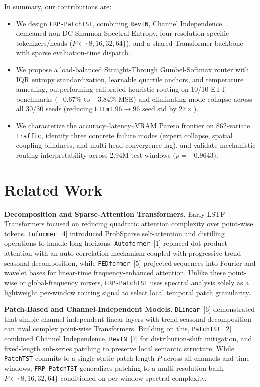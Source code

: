 \documentclass[11pt, letterpaper]{article}
\begin{document}
In summary, our contributions are:
\begin{itemize}[noitemsep]
  \item We design \texttt{FRP-PatchTST}, combining \texttt{RevIN}, Channel Independence, demeaned non-DC Shannon Spectral Entropy, four resolution-specific tokenizers/heads ($P \in \{8,16,32,64\}$), and a shared Transformer backbone with sparse evaluation-time dispatch.
  \item We propose a load-balanced Straight-Through Gumbel-Softmax router with IQR entropy standardization, learnable quartile anchors, and temperature annealing, outperforming calibrated heuristic routing on 10/10 ETT benchmarks ($-0.67\%$ to $-3.84\%$ MSE) and eliminating mode collapse across all 30/30 seeds (reducing \texttt{ETTm1} $96\to96$ seed std by $27\times$).
  \item We characterize the accuracy--latency--VRAM Pareto frontier on 862-variate \texttt{Traffic}, identify three concrete failure modes (expert collapse, spatial coupling blindness, and multi-head convergence lag), and validate mechanistic routing interpretability across 2.94M test windows ($\rho = -0.9643$).
\end{itemize}

\section{Related Work}

\textbf{Decomposition and Sparse-Attention Transformers.} Early LSTF Transformers focused on reducing quadratic attention complexity over point-wise tokens. \texttt{Informer}~[4] introduced ProbSparse self-attention and distilling operations to handle long horizons. \texttt{Autoformer}~[1] replaced dot-product attention with an auto-correlation mechanism coupled with progressive trend-seasonal decomposition, while \texttt{FEDformer}~[5] projected sequences into Fourier and wavelet bases for linear-time frequency-enhanced attention. Unlike these point-wise or global-frequency mixers, \texttt{FRP-PatchTST} uses spectral analysis solely as a lightweight per-window routing signal to select local temporal patch granularity.

\textbf{Patch-Based and Channel-Independent Models.} \texttt{DLinear}~[6] demonstrated that simple channel-independent linear layers with trend-seasonal decomposition can rival complex point-wise Transformers. Building on this, \texttt{PatchTST}~[2] combined Channel Independence, \texttt{RevIN}~[7] for distribution-shift mitigation, and fixed-length sub-series patching to preserve local semantic structure. While \texttt{PatchTST} commits to a single static patch length $P$ across all channels and time windows, \texttt{FRP-PatchTST} generalizes patching to a multi-resolution bank $P \in \{8, 16, 32, 64\}$ conditioned on per-window spectral complexity.
\end{document}
